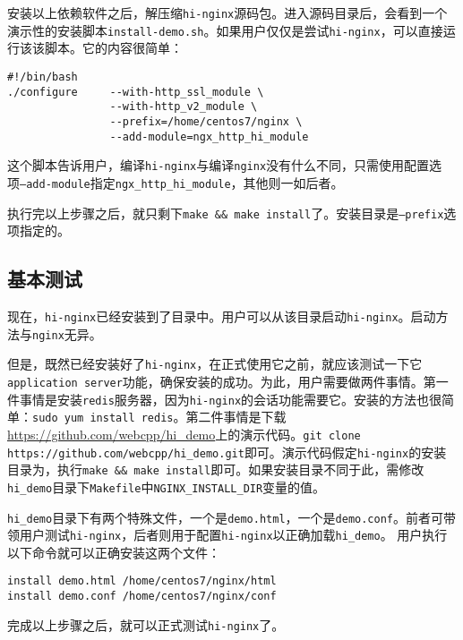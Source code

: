 安装以上依赖软件之后，解压缩\texttt{hi-nginx}源码包。进入源码目录后，会看到一个演示性的安装脚本\texttt{install-demo.sh}。如果用户仅仅是尝试\texttt{hi-nginx}，可以直接运行该该脚本。它的内容很简单：
\begin{lstlisting}
#!/bin/bash
./configure     --with-http_ssl_module \
                --with-http_v2_module \
                --prefix=/home/centos7/nginx \
                --add-module=ngx_http_hi_module
\end{lstlisting}
这个脚本告诉用户，编译\texttt{hi-nginx}与编译\texttt{nginx}没有什么不同，只需使用配置选项\texttt{--add-module}指定\texttt{ngx_http_hi_module}，其他则一如后者。

执行完以上步骤之后，就只剩下\texttt{make \&\& make install}了。安装目录是\texttt{--prefix}选项指定的。


\subsection{基本测试}
现在，\texttt{hi-nginx}已经安装到了目录中。用户可以从该目录启动\texttt{hi-nginx}。启动方法与\texttt{nginx}无异。

但是，既然已经安装好了\texttt{hi-nginx}，在正式使用它之前，就应该测试一下它\texttt{application server}功能，确保安装的成功。为此，用户需要做两件事情。第一件事情是安装\texttt{redis}服务器，因为\texttt{hi-nginx}的会话功能需要它。安装的方法也很简单：\texttt{sudo yum install redis}。第二件事情是下载\url{https://github.com/webcpp/hi_demo}上的演示代码。\texttt{git clone https://github.com/webcpp/hi_demo.git}即可。演示代码假定\texttt{hi-nginx}的安装目录为，执行\texttt{make \&\& make install}即可。如果安装目录不同于此，需修改\texttt{hi_demo}目录下\texttt{Makefile}中\texttt{NGINX_INSTALL_DIR}变量的值。

\texttt{hi_demo}目录下有两个特殊文件，一个是\texttt{demo.html}，一个是\texttt{demo.conf}。前者可带领用户测试\texttt{hi-nginx}，后者则用于配置\texttt{hi-nginx}以正确加载\texttt{hi_demo}。
用户执行以下命令就可以正确安装这两个文件：
\begin{lstlisting}
install demo.html /home/centos7/nginx/html
install demo.conf /home/centos7/nginx/conf
\end{lstlisting}
完成以上步骤之后，就可以正式测试\texttt{hi-nginx}了。

